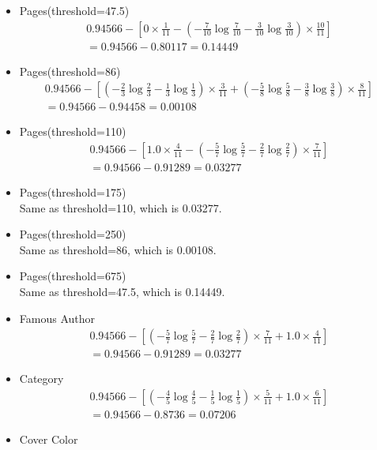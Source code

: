 \begin{enumerate}
\begin{itemize}
\begin{itemize}
\item Pages(threshold=47.5)
\begin{eqnarray*}
0.94566 - \left[ 0 \times \frac{1}{11} - \left( -\frac{7}{10} \log \frac{7}{10} - \frac{3}{10} \log \frac{3}{10} \right) \times \frac{10}{11}  \right]\\ = 0.94566 - 0.80117 = 0.14449
\end{eqnarray*}
\item Pages(threshold=86)
\begin{eqnarray*}
0.94566 - \left[ \left( -\frac{2}{3} \log \frac{2}{3} -\frac{1}{3} \log \frac{1}{3} \right) \times \frac{3}{11} + \left( -\frac{5}{8} \log \frac{5}{8} - \frac{3}{8} \log \frac{3}{8} \right) \times \frac{8}{11} \right]\\ = 0.94566 - 0.94458 = 0.00108
\end{eqnarray*}
\item Pages(threshold=110)
\begin{eqnarray*}
0.94566 - \left[ 1.0 \times \frac{4}{11} - \left( -\frac{5}{7} \log \frac{5}{7} - \frac{2}{7} \log \frac{2}{7} \right) \times \frac{7}{11}  \right]\\ = 0.94566 - 0.91289 = 0.03277
\end{eqnarray*}
\item Pages(threshold=175)\\
Same as threshold=110, which is 0.03277.
\item Pages(threshold=250)\\
Same as threshold=86, which is 0.00108.
\item Pages(threshold=675)\\
Same as threshold=47.5, which is 0.14449.
\item Famous Author
\begin{eqnarray*}
0.94566 - \left[ \left( -\frac{5}{7} \log \frac{5}{7} -\frac{2}{7} \log \frac{2}{7} \right) \times \frac{7}{11} + 1.0 \times \frac{4}{11} \right]\\ = 0.94566 - 0.91289 = 0.03277
\end{eqnarray*}
\item Category
\begin{eqnarray*}
0.94566 - \left[ \left( -\frac{4}{5} \log \frac{4}{5} -\frac{1}{5} \log \frac{1}{5} \right) \times \frac{5}{11} + 1.0 \times \frac{6}{11} \right]\\ = 0.94566 - 0.8736 = 0.07206
\end{eqnarray*}
\item Cover Color

\end{itemize}
\end{itemize}
\end{enumerate}
